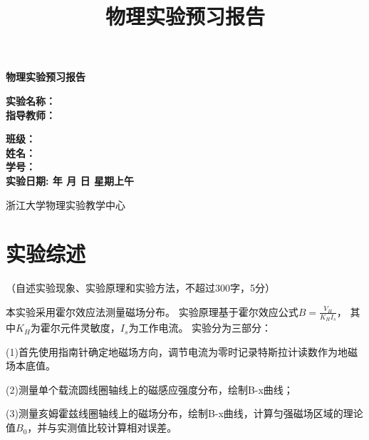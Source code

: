 \documentclass[10pt,a4paper]{ctexart}
\title{\xiaochu\textbf{物理实验预习报告}}
\author{}
\date{}
\newcommand{\myspace}[1]{\par\vspace{#1\baselineskip}} %
\newcommand{\xiaochu}{\fontsize{36pt}{42pt}\selectfont}
\newcommand{\sanhao}{\fontsize{16pt}{20pt}\selectfont}
\newcommand{\sihao}{\fontsize{14pt}{18pt}\selectfont}
\newcommand{\xiaosi}{\fontsize{12pt}{16pt}\selectfont}
\begin{document}
\vspace*{36pt} %

\begin{center}   
    \xiaochu\textbf{物理实验预习报告}
    \vspace{13pt}
    \vspace{13pt}
    \vspace{13pt}
    \vspace{13pt}
    
    \sanhao\textbf{实验名称：\underline{}} \\[10pt]
    \sanhao\textbf{指导教师：\underline{}} \\[30pt]
    
    \myspace{6}
    
   \sihao\textbf{班级：\underline{\makebox[6cm]{}}} \\[10pt]
    \sihao\textbf{姓名：\underline{\makebox[6cm]{}}} \\[10pt]
    \sihao\textbf{学号：\underline{\makebox[6cm]{}}} \\[30pt]
    
   \sihao\textbf{实验日期: 
   \underline{}  年 
   \underline{}月
   \underline{}日  
   星期\underline{}上午}
    
    \vspace{18pt}
    \sihao 浙江大学物理实验教学中心
    
\end{center}

\newpage

    \section{实验综述}
    
    \xiaosi （自述实验现象、实验原理和实验方法，不超过300字，5分）

本实验采用霍尔效应法测量磁场分布。
实验原理基于霍尔效应公式$B = \frac{V_H}{K_H I_s}$，
其中$K_H$为霍尔元件灵敏度，$I_s$为工作电流。
实验分为三部分：

(1)首先使用指南针确定地磁场方向，调节电流为零时记录特斯拉计读数作为地磁场本底值。

(2)测量单个载流圆线圈轴线上的磁感应强度分布，绘制B-x曲线；

(3)测量亥姆霍兹线圈轴线上的磁场分布，绘制B-x曲线，计算匀强磁场区域的理论值$B_0$，并与实测值比较计算相对误差。
\end{document}
